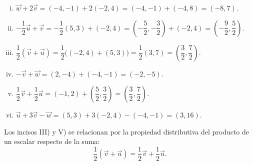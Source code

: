 \begin{enumerate}[\hspace{-3mm}$1)$]
\begin{sol}
\begin{enumerate}[i)]
\item $\vec w+2\vec v=(-4,-1)+2(-2,4)=(-4,-1)+(-4,8)=(-8,7)$.
\item $-\dfrac12\vec u+\vec v=-\dfrac12(5,3)+(-2,4)=\left(-\dfrac52,-\dfrac32\right)+(-2,4)=\left(-\dfrac92,\dfrac52\right)$.
\item $\dfrac12(\vec v+\vec u)=\dfrac12\big((-2,4)+(5,3)\big)=\dfrac12(3,7)=\left(\dfrac32,\dfrac72\right)$.
\item $-\vec v+\vec w=(2,-4)+(-4,-1)=(-2,-5)$.
\item $\dfrac12\vec v+\dfrac12\vec u=(-1,2)+\left(\dfrac52,\dfrac32\right)=\left(\dfrac32,\dfrac72\right)$.
\item $\vec u+3\vec v-\vec w=(5,3)+3(-2,4)-(-4,-1)=(3,16)$.
\end{enumerate}

Los incisos III) y V) se relacionan por la propiedad distributiva del producto de un escalar respecto de la suma:
\[
\frac12(\vec v+\vec u)=\frac12\vec v+\frac12\vec u.
\]

\begin{center}
\end{center}
\end{sol}


\end{enumerate}
